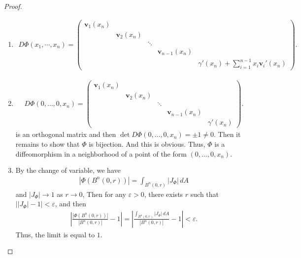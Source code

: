\documentclass[11pt]{article}
\theoremstyle{definition}
\theoremstyle{definition}
\begin{document}
\begin{proof}
~\begin{enumerate}[label=(\alph*)]
    \item 
    \begin{align*}
        D\Phi(x_1,\cdots,x_n) = \begin{pmatrix}
            \mathbf{v}_1(x_n) &  &  &  &  \\
            & \mathbf{v}_2(x_n) &  &  &  \\
            &  & \ddots &  & \\
            &  &  & \mathbf{v}_{n-1}(x_n) \\
            &  &  &  & \gamma'(x_n) + \sum^{n-1}_{i=1}x_i \mathbf{v}_i'(x_n)
        \end{pmatrix}.
    \end{align*}
    
    \item 
    \begin{align*}
        D\Phi(0,\ldots, 0, x_n) = \begin{pmatrix}
            \mathbf{v}_1(x_n) &  &  &  &  \\
            & \mathbf{v}_2(x_n) &  &  &  \\
            &  & \ddots &  & \\
            &  &  & \mathbf{v}_{n-1}(x_n) \\
            &  &  &  & \gamma'(x_n)
        \end{pmatrix}.
    \end{align*}
    is an orthogonal matrix and then $\det D\Phi(0,\ldots, 0, x_n) = \pm 1 \neq 0$. Then it remains to show that $\Phi$ is bijection. And this is obvious. Thus, $\Phi$ is a diffeomorphism in a neighborhood of a point of the form $(0,\ldots,0,x_n)$.
    
    \item By the change of variable, we have
    \begin{align*}
        \left|\Phi(B^n(0,r))\right| = \int_{B^n(0,r)} |J_\Phi|\, dA
    \end{align*}
    and $|J_\Phi| \to 1$ as $r \to 0$, Then for any $\varepsilon > 0$, there exists $r$ such that $\left||J_\Phi| - 1\right| < \varepsilon$, and then
    \begin{align*}
        \left|\frac{|\Phi(B^n(0,r))|}{|B^n(0,r)|} - 1\right| = \left|\frac{\int_{B^n(0,r)} |J_\Phi|\, dA}{|B^n(0,r)|} - 1\right|< \varepsilon.
    \end{align*}
    Thus, the limit is equal to $1$.
\end{enumerate}
\end{proof}
\end{document}
